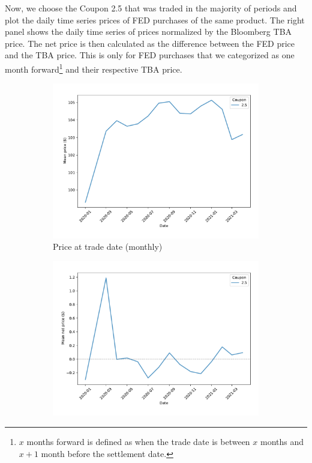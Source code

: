 \documentclass[11pt,a4paper]{article}
\begin{document}
\pagebreak

Now, we choose the Coupon 2.5 that was traded in the majority of periods and plot the daily time series prices  of FED purchases of the same product. The right panel shows the daily time series of prices normalized by the Bloomberg TBA price.  The net price is then calculated as the difference between the FED price and the TBA price. This is only for FED purchases that we categorized as one month forward\footnote{$x$ months forward is defined as when the trade date is between $x$ months and $x+1$ month before the settlement date.}
and their respective TBA price.

\begin{figure}[h]
  \centering
  \begin{subfigure}[b]{0.49\textwidth}
    \includegraphics[width=0.998\textwidth]{../results/figures/fed_price_mean_mat30_loan1_timeseries_cpmonthly_coup2.5}
    \caption{ Price at trade date (monthly)}
   \end{subfigure}
   \begin{subfigure}[b]{0.49\textwidth}
    \includegraphics[width=0.998\textwidth]{../results/figures/fed_price_mean_mat30_loan1_timeseries_cpmonthly_normalized_coup2.5}

\end{subfigure}
\end{figure}
\end{document}
